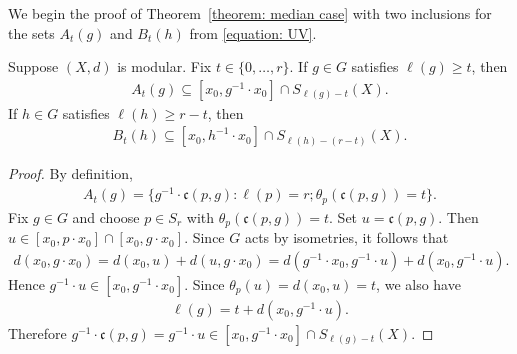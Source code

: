 \documentclass[12pt,reqno]{amsart}
\numberwithin{equation}{section}
\begin{document}
We begin the proof of Theorem~\ref{theorem: median case} with two inclusions for the sets $A_t(g)$ and $B_t(h)$ from \eqref{equation: UV}.
\begin{lemma}\label{lemma: inclusions of A and B}
    Suppose $(X,d)$ is modular.
    Fix $t\in\{0,\ldots,r\}$. If $g\in G$ satisfies $\ell(g)\ge t$, then
    \begin{align*}
        A_t(g)\subseteq [x_0,g^{-1}\cdot x_0]\cap S_{\ell(g)-t}(X).
    \end{align*}
    If $h\in G$ satisfies $\ell(h)\ge r-t$, then 
    \begin{align*}
        B_t(h)\subseteq [x_0,h^{-1}\cdot x_0]\cap S_{\ell(h)-(r-t)}(X).
    \end{align*}
\end{lemma}
\begin{proof}
    By definition,
    \begin{align*}
        A_t(g)=\{g^{-1}\cdot \mathfrak{c}(p,g): \ell(p)=r;\theta_p(\mathfrak{c}(p,g))=t\}.
    \end{align*}
    Fix $g\in G$ and choose $p\in S_r$ with $\theta_p(\mathfrak{c}(p,g))=t$. Set $u=\mathfrak{c}(p,g)$. Then $u\in [x_0,p\cdot x_0]\cap [x_0,g\cdot x_0]$. Since $G$ acts by isometries, it follows that
    \begin{align*}
        d(x_0,g\cdot x_0)=d(x_0,u)+d(u,g\cdot x_0)=d(g^{-1}\cdot x_0,g^{-1}\cdot u)+d(x_0,g^{-1}\cdot u).
    \end{align*}
    Hence $g^{-1}\cdot u\in [x_0,g^{-1}\cdot x_0]$. Since $\theta_p(u)=d(x_0,u)=t$, we also have
    \begin{align*}
        \ell(g)=t+d(x_0,g^{-1}\cdot u).
    \end{align*}
    Therefore $g^{-1}\cdot\mathfrak{c}(p,g)=g^{-1}\cdot u\in [x_0,g^{-1}\cdot x_0]\cap S_{\ell(g)-t}(X)$.
    

\end{proof}
\end{document}
